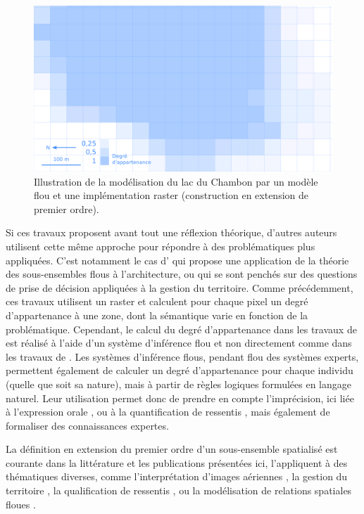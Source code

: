 \begin{figure}
  \centering
  \includegraphics{../figures/fig11.png}
  \caption{Illustration de la modélisation du lac du Chambon par un
    modèle flou et une implémentation raster (\ie construction en
    extension de premier ordre).}
  \label{fig:champ_raster}
\end{figure}

Si ces travaux proposent avant tout une réflexion théorique, d’autres
auteurs utilisent cette même approche pour répondre à des
problématiques plus appliquées. C’est notamment le cas
d’\textcite{Arabacioglu2010} qui propose une application de la théorie
des sous-ensembles flous à l’architecture, ou
\textcite{Kurtener2000,Makropoulos2003,Girot2007} qui se sont penchés
sur des questions de prise de décision appliquées à la gestion du
territoire. Comme précédemment, ces travaux utilisent un raster et
calculent pour chaque pixel un degré d’appartenance à une zone, dont
la sémantique varie en fonction de la problématique. Cependant, le
calcul du degré d’appartenance dans les travaux de
\textcite{Griot2007,Makropoulos2003,Arabacioglu2010} est réalisé à
l’aide d’un système d’inférence flou et non directement comme dans les
travaux de \textcite{Vanegass2011,Takemura2012}. Les systèmes
d’inférence flous, pendant flou des systèmes experts, permettent
également de calculer un degré d’appartenance pour chaque individu
(quelle que soit sa nature), mais à partir de règles logiques
formulées en langage naturel.  Leur utilisation permet donc de prendre
en compte l’imprécision, ici liée à l’expression orale
\autocite{Makropoulos2003,Griot2007}, ou à la quantification de
ressentis \autocite{Arabacioglu2010}, mais également de formaliser des
connaissances expertes.

La définition en extension du premier ordre d’un sous-ensemble
spatialisé est courante dans la littérature et les publications
présentées ici, l’appliquent à des thématiques diverses, comme
l’interprétation d’images aériennes \autocite{Brandtberg2002,
  Fonte2005}, la gestion du territoire
\autocite{Griot2007,Makropoulos2003}, la qualification de ressentis
\autocite{Arabacioglu2010}, ou la modélisation de relations spatiales
floues \textcite{Vanegass2011,Takemura2012}.

